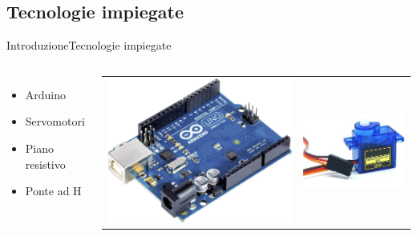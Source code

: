 \documentclass[10pt,aspectratio=169
	]{beamer}
\begin{document}
	\subsection{Tecnologie impiegate}
	\begin{frame}{Introduzione}{Tecnologie impiegate}

	\begin{columns}
	
	\begin{itemize}
		\item Arduino
		\item Servomotori
		\item Piano resistivo
		\item Ponte ad H
	\end{itemize}
	\begin{tabular}{cc}
	\hspace{0.5cm}
  \includegraphics[height=0.3\textheight]{images/1.jpg}
  &
  \hspace{0.3cm}
  \includegraphics[height=0.3\textheight]{images/2.jpg}
 \end{tabular}


\end{columns}
\end{frame}
\end{document}
